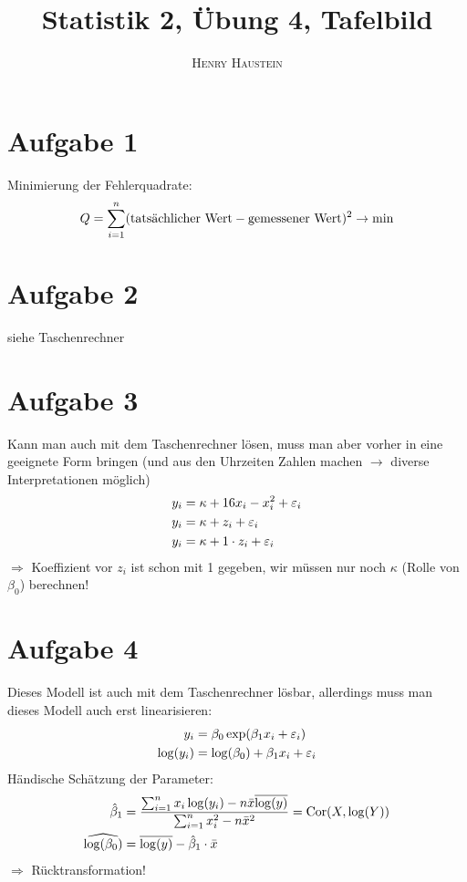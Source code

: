 \documentclass{article}
\title{\textbf{Statistik 2, Übung 4, Tafelbild}}
\author{\textsc{Henry Haustein}}
\date{}
\DeclareMathOperator{\Cor}{Cor}
\begin{document}
	\maketitle
	
	\section*{Aufgabe 1}
	Minimierung der Fehlerquadrate:
	\begin{align}
		Q = \sum_{i=1}^{n} (\text{tatsächlicher Wert} - \text{gemessener Wert})^2 \to\min \notag
	\end{align}

	\section*{Aufgabe 2}
	siehe Taschenrechner

	\section*{Aufgabe 3}
	Kann man auch mit dem Taschenrechner lösen, muss man aber vorher in eine geeignete Form bringen (und aus den Uhrzeiten Zahlen machen $\to$ diverse Interpretationen möglich)
	\begin{align}
		y_i &= \kappa + 16x_i - x_i^2  + \varepsilon_i \notag \\
		y_i &= \kappa + z_i + \varepsilon_i \notag \\
		y_i &= \kappa + 1\cdot z_i + \varepsilon_i \notag
	\end{align}
	$\Rightarrow$ Koeffizient vor $z_i$ ist schon mit 1 gegeben, wir müssen nur noch $\kappa$ (Rolle von $\beta_0$) berechnen!
	
	\section*{Aufgabe 4}
	Dieses Modell ist auch mit dem Taschenrechner lösbar, allerdings muss man dieses Modell auch erst linearisieren:
	\begin{align}
		y_i &= \beta_0\exp(\beta_1x_i + \varepsilon_i) \notag \\
		\log(y_i) &= \log(\beta_0) + \beta_1x_i + \varepsilon_i \notag
	\end{align}
	Händische Schätzung der Parameter:
	\begin{align}
		\hat{\beta}_1 &= \frac{\sum_{i=1}^n x_i\log(y_i) - n\bar{x}\overline{\log(y)}}{\sum_{i=1}^n x_i^2 - n\bar{x}^2} = \Cor(X, \log(Y)) \notag \\
		\widehat{\log(\beta_0)} &= \overline{\log(y)} - \hat{\beta}_1\cdot\bar{x} \notag
	\end{align}
	$\Rightarrow$ Rücktransformation!
	
\end{document}
